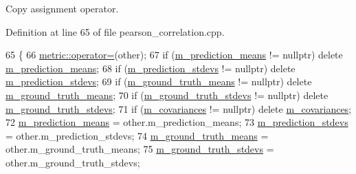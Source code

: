 Copy assignment operator. 

Definition at line 65 of file pearson\+\_\+correlation.\+cpp.


\begin{DoxyCode}
65                                                                                                          \{
66   \hyperlink{classlbann_1_1metric_a4324342dab4892199a47df1d78b2cef5}{metric::operator=}(other);
67   \textcolor{keywordflow}{if} (\hyperlink{classlbann_1_1pearson__correlation__metric_ac664eebee2c3d3287848c570400bdddb}{m\_prediction\_means} != \textcolor{keyword}{nullptr})    \textcolor{keyword}{delete} 
      \hyperlink{classlbann_1_1pearson__correlation__metric_ac664eebee2c3d3287848c570400bdddb}{m\_prediction\_means};
68   \textcolor{keywordflow}{if} (\hyperlink{classlbann_1_1pearson__correlation__metric_ad288c4206078866feb39a4f982d8e975}{m\_prediction\_stdevs} != \textcolor{keyword}{nullptr})   \textcolor{keyword}{delete} 
      \hyperlink{classlbann_1_1pearson__correlation__metric_ad288c4206078866feb39a4f982d8e975}{m\_prediction\_stdevs};
69   \textcolor{keywordflow}{if} (\hyperlink{classlbann_1_1pearson__correlation__metric_aa67f395597bf6bbf9bd57645877f26a5}{m\_ground\_truth\_means} != \textcolor{keyword}{nullptr})  \textcolor{keyword}{delete} 
      \hyperlink{classlbann_1_1pearson__correlation__metric_aa67f395597bf6bbf9bd57645877f26a5}{m\_ground\_truth\_means};
70   \textcolor{keywordflow}{if} (\hyperlink{classlbann_1_1pearson__correlation__metric_a7ed5e7a1778d17f852f4277afcaa31ed}{m\_ground\_truth\_stdevs} != \textcolor{keyword}{nullptr}) \textcolor{keyword}{delete} 
      \hyperlink{classlbann_1_1pearson__correlation__metric_a7ed5e7a1778d17f852f4277afcaa31ed}{m\_ground\_truth\_stdevs};
71   \textcolor{keywordflow}{if} (\hyperlink{classlbann_1_1pearson__correlation__metric_aeabb941e22f2718a59103b7ec98a9c1e}{m\_covariances} != \textcolor{keyword}{nullptr})         \textcolor{keyword}{delete} \hyperlink{classlbann_1_1pearson__correlation__metric_aeabb941e22f2718a59103b7ec98a9c1e}{m\_covariances};
72   \hyperlink{classlbann_1_1pearson__correlation__metric_ac664eebee2c3d3287848c570400bdddb}{m\_prediction\_means}    = other.m\_prediction\_means;
73   \hyperlink{classlbann_1_1pearson__correlation__metric_ad288c4206078866feb39a4f982d8e975}{m\_prediction\_stdevs}   = other.m\_prediction\_stdevs;
74   \hyperlink{classlbann_1_1pearson__correlation__metric_aa67f395597bf6bbf9bd57645877f26a5}{m\_ground\_truth\_means}  = other.m\_ground\_truth\_means;
75   \hyperlink{classlbann_1_1pearson__correlation__metric_a7ed5e7a1778d17f852f4277afcaa31ed}{m\_ground\_truth\_stdevs} = other.m\_ground\_truth\_stdevs;

\end{DoxyCode}
